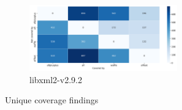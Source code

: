 \begin{figure}
    \begin{subfigure}[t]{\textwidth}
        \centering
        \includegraphics[width=0.70\textwidth]{Experiments/libxml2-v2.9.2_pairwise_unique_coverage_plot.png}
        \caption{libxml2-v2.9.2}
        \label{fig:sub:libxml-cov-uniq}
    \end{subfigure}

    \caption{Unique coverage findings}
    \label{fig:cov-growth-uniq}
\end{figure}


